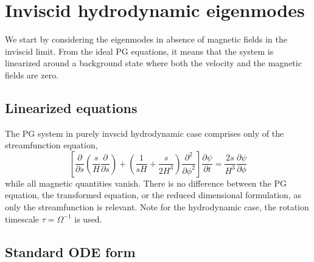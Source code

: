 \section{Inviscid hydrodynamic eigenmodes}

We start by considering the eigenmodes in absence of magnetic fields in the inviscid limit.
From the ideal PG equations, it means that the system is linearized around a background state where both the velocity and the magnetic fields are zero.

\subsection{Linearized equations}

The PG system in purely invscid hydrodynamic case comprises only of the streamfunction equation,
\begin{equation}
    \left[\frac{\partial}{\partial s}\left(\frac{s}{H}\frac{\partial}{\partial s}\right) + \left(\frac{1}{sH} + \frac{s}{2H^3}\right)\frac{\partial^2}{\partial \phi^2}\right] \frac{\partial \psi}{\partial t} = \frac{2 s}{H^{3}} \frac{\partial \psi}{\partial \phi}
\end{equation}
while all magnetic quantities vanish. There is no difference between the PG equation, the transformed equation, or the reduced dimensional formulation, as only the streamfunction is relevant.
Note for the hydrodynamic case, the rotation timescale $\tau = \Omega^{-1}$ is used.

\subsection{Standard ODE form}

